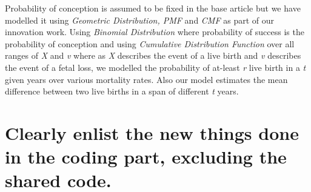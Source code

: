 \documentclass{article}
\begin{document}
Probability of conception is assumed to be fixed in the base article but we have modelled it using {\slshape Geometric Distribution, PMF} and {\slshape CMF} as part of our innovation work. Using {\slshape Binomial Distribution} where probability of success is the probability of conception and using {\slshape Cumulative Distribution Function} over all ranges of {\slshape X} and {\slshape v} where as {\slshape X} describes the event of a live birth and {\slshape v} describes the event of a fetal loss, we modelled the probability of at-least {\slshape r} live birth in a {\slshape t} given years over various mortality rates. Also our model estimates the mean difference between two live births in a span of different {\slshape t} years.\\


\section{Clearly enlist the new things done in the coding part, excluding the shared code.}
\end{document}
